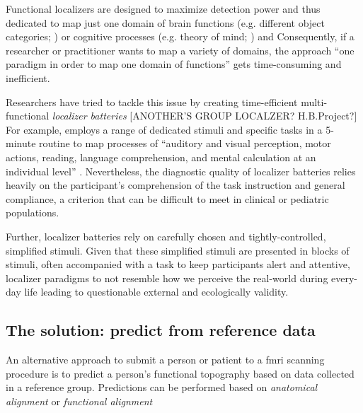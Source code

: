 Functional localizers are designed to maximize detection power and thus
dedicated to map just one domain of brain functions (e.g. different object
categories; \citet{kanwisher1997ffa}) or cognitive processes (e.g. theory of
mind; \citet{spunt2014validating}) and
Consequently, if a researcher or practitioner wants to map a variety of domains,
the approach ``one paradigm in order to map one domain of functions'' gets
time-consuming and inefficient.

Researchers have tried to tackle this issue by creating time-efficient
multi-functional \textit{localizer batteries} \citep{pinel2007fast,
pinho2018individual, pinho2020individual} [ANOTHER'S GROUP LOCALZER?
H.B.Project?]
For example, \citet{pinel2007fast} employs a range of dedicated stimuli and
specific tasks in a 5-minute routine to map processes of ``auditory and visual
perception, motor actions, reading, language comprehension, and mental
calculation at an individual level'' \citet{pinel2007fast}.
Nevertheless, the diagnostic quality of localizer batteries relies heavily on
the participant's comprehension of the task instruction and general compliance,
a criterion that can be difficult to meet in clinical or pediatric populations.


Further, localizer batteries rely on carefully chosen and tightly-controlled,
simplified stimuli.
%
Given that these simplified stimuli are presented in blocks of stimuli, often
accompanied with a task to keep participants alert and attentive, localizer
paradigms to not resemble how we perceive the real-world during every-day life
leading to questionable external and ecologically validity.


\subsection{The solution: predict from reference data}


An alternative approach to submit a person or patient to a \ac{fmri} scanning
procedure is to predict a person's functional topography based on data collected
in a reference group. Predictions can be performed based on \textit{anatomical
alignment} or \textit{functional alignment}


